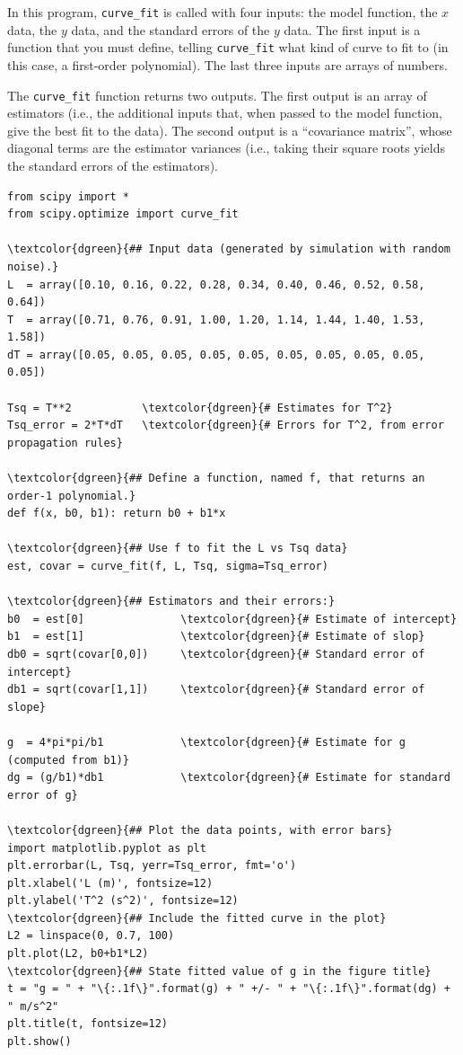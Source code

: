 \documentclass[11pt,a4paper]{article}
\begin{document}
In this program, \texttt{curve\_fit} is called with four inputs: the
model function, the $x$ data, the $y$ data, and the standard errors of
the $y$ data.  The first input is a function that you must define,
telling \texttt{curve\_fit} what kind of curve to fit to (in this
case, a first-order polynomial).  The last three inputs are arrays of
numbers.

The \texttt{curve\_fit} function returns two outputs.  The first
output is an array of estimators (i.e., the additional inputs that,
when passed to the model function, give the best fit to the data).
The second output is a ``covariance matrix'', whose diagonal terms are
the estimator variances (i.e., taking their square roots yields the
standard errors of the estimators).

\begin{Verbatim}[frame=single,baselinestretch=1,fontsize=\small,commandchars=\\\{\}]
from scipy import *
from scipy.optimize import curve_fit

\textcolor{dgreen}{## Input data (generated by simulation with random noise).}
L  = array([0.10, 0.16, 0.22, 0.28, 0.34, 0.40, 0.46, 0.52, 0.58, 0.64])
T  = array([0.71, 0.76, 0.91, 1.00, 1.20, 1.14, 1.44, 1.40, 1.53, 1.58])
dT = array([0.05, 0.05, 0.05, 0.05, 0.05, 0.05, 0.05, 0.05, 0.05, 0.05])

Tsq = T**2           \textcolor{dgreen}{# Estimates for T^2}
Tsq_error = 2*T*dT   \textcolor{dgreen}{# Errors for T^2, from error propagation rules}

\textcolor{dgreen}{## Define a function, named f, that returns an order-1 polynomial.}
def f(x, b0, b1): return b0 + b1*x

\textcolor{dgreen}{## Use f to fit the L vs Tsq data}
est, covar = curve_fit(f, L, Tsq, sigma=Tsq_error)

\textcolor{dgreen}{## Estimators and their errors:}
b0  = est[0]               \textcolor{dgreen}{# Estimate of intercept}
b1  = est[1]               \textcolor{dgreen}{# Estimate of slop}
db0 = sqrt(covar[0,0])     \textcolor{dgreen}{# Standard error of intercept}
db1 = sqrt(covar[1,1])     \textcolor{dgreen}{# Standard error of slope}

g  = 4*pi*pi/b1            \textcolor{dgreen}{# Estimate for g (computed from b1)}
dg = (g/b1)*db1            \textcolor{dgreen}{# Estimate for standard error of g}

\textcolor{dgreen}{## Plot the data points, with error bars}
import matplotlib.pyplot as plt
plt.errorbar(L, Tsq, yerr=Tsq_error, fmt='o')
plt.xlabel('L (m)', fontsize=12)
plt.ylabel('T^2 (s^2)', fontsize=12)
\textcolor{dgreen}{## Include the fitted curve in the plot}
L2 = linspace(0, 0.7, 100)
plt.plot(L2, b0+b1*L2)
\textcolor{dgreen}{## State fitted value of g in the figure title}
t = "g = " + "\{:.1f\}".format(g) + " +/- " + "\{:.1f\}".format(dg) + " m/s^2"
plt.title(t, fontsize=12)
plt.show()
\end{Verbatim}
\end{document}
